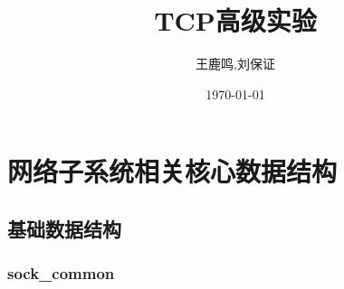 \documentclass[11pt, a4paper,oneside]{book}
\theoremstyle{ocrenumbox}
\theoremstyle{purplenumbox}
\theoremstyle{blackbox}
\begin{document}
\pagestyle{empty} %
\title{TCP高级实验}
\author{王鹿鸣,刘保证}
\date{\today}
\maketitle
\setcounter{secnumdepth}{3}
\frontmatter
\tableofcontents

\mainmatter
\pagestyle{fancy}

\chapter{网络子系统相关核心数据结构}
	\section{基础数据结构}	
		\subsection{sock\_common}
\end{document}
